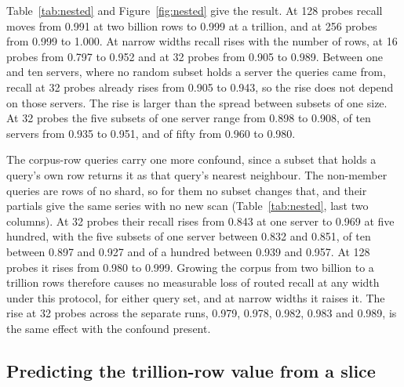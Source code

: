 \documentclass[sigconf, nonacm]{acmart}
\begin{document}
Table~\ref{tab:nested} and Figure~\ref{fig:nested} give the result. At 128 probes recall moves
from 0.991 at two billion rows to 0.999 at a trillion, and at 256 probes from 0.999 to 1.000. At
narrow widths recall rises with the number of rows, at 16 probes from 0.797 to 0.952 and at 32
probes from 0.905 to 0.989. Between one and ten servers, where no random subset holds a server the
queries came from, recall at 32 probes already rises from 0.905 to 0.943, so the rise does not
depend on those servers. The rise is larger than the spread between subsets of one size. At 32
probes the five subsets of one server range from 0.898 to 0.908, of ten servers from 0.935 to
0.951, and of fifty from 0.960 to 0.980.

The corpus-row queries carry one more confound, since a subset that holds a query's own row
returns it as that query's nearest neighbour. The non-member queries are rows of no shard, so for
them no subset changes that, and their partials give the same series with no new scan
(Table~\ref{tab:nested}, last two columns). At 32 probes their recall rises from 0.843 at one server
to 0.969 at five hundred, with the five subsets of one server between 0.832 and 0.851, of ten
between 0.897 and 0.927 and of a hundred between 0.939 and 0.957. At 128 probes it rises from 0.980
to 0.999. Growing the corpus from two billion to a trillion rows therefore causes no measurable loss
of routed recall at any width under this protocol, for either query set, and at narrow widths it
raises it. The rise at 32 probes across the separate runs, 0.979, 0.978, 0.982, 0.983 and 0.989,
is the same effect with the confound present.

\subsection{Predicting the trillion-row value from a slice}
\label{sec:transfer}
\end{document}

